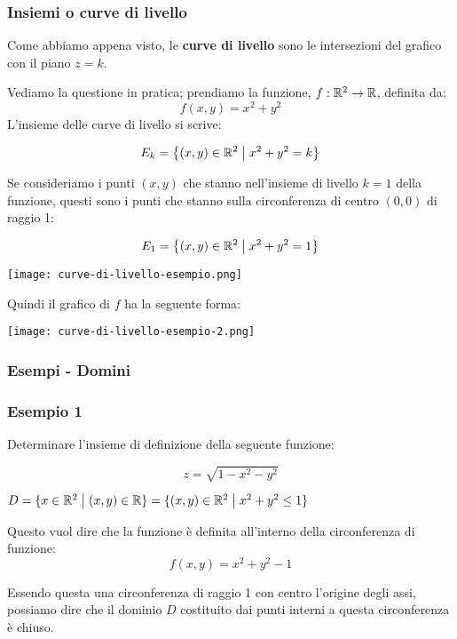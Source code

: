 \subsubsection{Insiemi o curve di livello}

Come abbiamo appena visto, le \textbf{curve di livello} sono le intersezioni del grafico con il piano \(z=k\).

Vediamo la questione in pratica; prendiamo la funzione, \(f: \mathbb{R}^2 \to \mathbb{R} \), definita da:
\[
    f(x,y) = x^2 + y^2
\]
L'insieme delle curve di livello si scrive:

\[
    E_k = \left\{ (x,y) \in \mathbb{R}^{2} \;\big|\; x^{2}+y^{2}=k \right\}
\]

Se consideriamo i punti \((x,y)\) che stanno nell'insieme di livello \(k=1\) della funzione, questi sono i punti che stanno sulla circonferenza di centro \((0,0)\) di raggio 1:

\[
    E_1 = \left\{ (x,y) \in \mathbb{R}^{2} \;\big|\; x^{2}+y^{2}=1 \right\}
\]

\begin{center}
    \texttt{[image: curve-di-livello-esempio.png]}
\end{center}

\filbreak{}
Quindi il grafico di \(f\) ha la seguente forma:

\begin{center}
    \texttt{[image: curve-di-livello-esempio-2.png]}
\end{center}

\pagebreak
\subsubsection{Esempi {-} Domini}

\subsubsection*{Esempio 1}

Determinare l'insieme di definizione della seguente funzione:

\[
    z = \sqrt{1-x^{2}-y^{2}}
\]

\(D = \{x \in \mathbb{R}^{2} \;\big|\; (x,y) \in \mathbb{R} \} = \{(x,y) \in \mathbb{R}^{2} \;\big|\; x^{2}+y^{2} \le 1\} \)

Questo vuol dire che la funzione è definita all'interno della circonferenza di funzione:
\[
    f(x,y) = x^2+y^2-1
\]

Essendo questa una circonferenza di raggio 1 con centro l'origine degli assi, possiamo dire che il dominio \(D\) costituito dai punti interni a questa circonferenza è chiuso.

